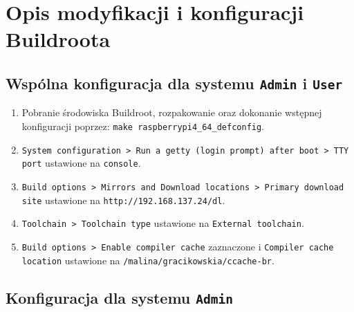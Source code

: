 \documentclass{article}
\begin{document}
\section{Opis modyfikacji i konfiguracji Buildroota}

\subsection{Wspólna konfiguracja dla systemu \texttt{Admin} i \texttt{User}}

\begin{enumerate}[label=\arabic*.]
    \item Pobranie środowiska Buildroot, rozpakowanie oraz dokonanie wstępnej konfiguracji poprzez: \texttt{make raspberrypi4\_64\_defconfig}.
    \item \texttt{System configuration > Run a getty (login prompt) after boot > TTY port} ustawione na \texttt{console}.
    \item \texttt{Build options > Mirrors and Download locations > Primary download site} ustawione na \texttt{http://192.168.137.24/dl}.
    \item \texttt{Toolchain > Toolchain type} ustawione na \texttt{External toolchain}.
    \item \texttt{Build options > Enable compiler cache} zaznaczone i \texttt{Compiler cache location} ustawione na \texttt{/malina/gracikowskia/ccache-br}.
\end{enumerate}

\subsection{Konfiguracja dla systemu \texttt{Admin}}
\end{document}
